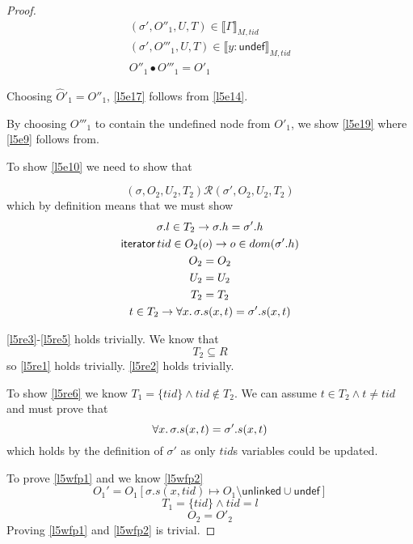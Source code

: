 \begin{proof}
\begin{gather} 	\label{l5e17}
(\sigma', O''_{1},U ,T) \in \llbracket \Gamma \rrbracket_{M,tid}
\\
 \label{l5e18}
(\sigma', O'''_{1},U ,T) \in \llbracket y:\mathsf{undef} \rrbracket_{M,tid}
\\
\label{l5e19}
O''_{1} \bullet O'''_{1} = O'_{1}
\end{gather}

Choosing $\hat{O}'_{1} = O''_{1}$, \ref{l5e17} follows from \ref{l5e14}.

By choosing $O'''_{1}$ to contain the undefined node from ${O}'_{1}$, we show \ref{l5e19} where \ref{l5e9} follows from.

To show \ref{l5e10} we need to show that 

\[
(\sigma, O_{2}, U_{2}, T_{2}) \mathcal{R} (\sigma', O_{2}, U_{2}, T_{2})
\]
which by definition means that we must show
\begin{gather}
\label{l5re1}
\sigma.l \in T_{2} \rightarrow \sigma.h = \sigma'.h
\\
\label{l5re2}
\textsf{iterator} \, tid \in O_{2}(o) \rightarrow  o \in dom(\sigma'.h)
\\
\label{l5re3}
O_{2} = O_{2}
\\
\label{l5re4}
U_{2} = U_{2}
\\
\label{l5re5}
T_{2} = T_{2}
\\
\label{l5re6}
t \in T_{2} \rightarrow \forall x \ldotp \sigma.s(x,t) = \sigma'.s(x,t)
\end{gather}

\ref{l5re3}-\ref{l5re5} holds trivially. We know that 
\[T_{2} \subseteq R\]
so \ref{l5re1} holds trivially. \ref{l5re2} holds trivially.

To show \ref{l5re6} we know $T_{1} = \{tid\} \land tid \notin T_{2}$.  We can assume $t \in T_{2} \land t \ne tid$ and must prove that 
\[
\forall x \ldotp \sigma.s(x,t) = \sigma'.s(x,t) 
\]
which holds by the definition of $\sigma'$ as only $tid$s variables could be updated. 

To prove \ref{l5wfp1} and we know \ref{l5wfp2}
\[O_{1}' = O_{1}[\sigma.s(x,tid) \mapsto O_{1} \setminus \mathsf{unlinked} \cup \mathsf{undef} ] \]
\[T_{1}=\{tid\} \land tid= l\]
\[O_{2} = O'_{2}\]
Proving \ref{l5wfp1} and \ref{l5wfp2} is trivial.
\end{proof}

